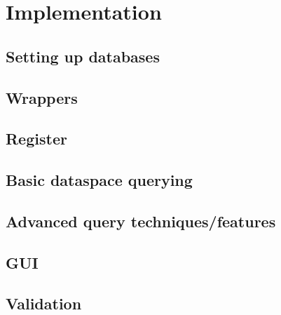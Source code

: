 \chapter{Implementation}
\section{Setting up databases}
\section{Wrappers}
\section{Register}
\section{Basic dataspace querying}
\section{Advanced query techniques/features}
\section{GUI}
\section{Validation}